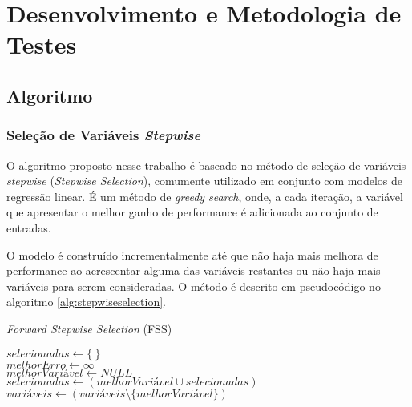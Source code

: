 \chapter[Desenvolvimento e Metodologia]{Desenvolvimento e Metodologia de Testes}

\section{Algoritmo}

\subsection{Seleção de Variáveis \textit{Stepwise}}

O algoritmo proposto nesse trabalho é baseado no método de seleção de variáveis \textit{stepwise} 
(\textit{Stepwise Selection}), comumente utilizado em conjunto com modelos de regressão linear. É um método de \textit{greedy search}, onde, a cada iteração, a variável que apresentar o melhor ganho de performance é adicionada ao conjunto de entradas. 

O modelo é construído incrementalmente até que não haja mais melhora de performance ao acrescentar alguma das variáveis restantes ou não haja mais variáveis para serem consideradas. O método é descrito em pseudocódigo no algoritmo \ref{alg:stepwiseselection}.

\qquad

\begin{algorithm}[H]
    \caption{\textit{Forward Stepwise Selection} (FSS)}
    $selecionadas \gets \{\ \}$ \\
    $melhorErro \gets \infty$ \\
    {   
        $melhorVariável \gets NULL$ \\     
        $selecionadas \gets (melhorVariável \cup selecionadas)$ \\
        $variáveis \gets (variáveis \setminus \{melhorVariável\})$ \\
    }
    \label{alg:stepwiseselection}
\end{algorithm}

